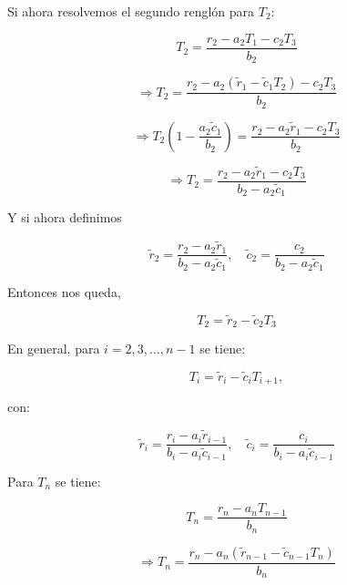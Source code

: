 \documentclass[11pt,a4paper]{article}
\begin{document}
Si ahora resolvemos el segundo rengl\'on para $T_2$:

\begin{equation}
T_2 = \frac{r_2 - a_2 T_1 - c_2 T_3}{b_2}
\end{equation}

\begin{equation}
\Rightarrow T_2 = \frac{r_2 - a_2 (\tilde{r}_1 - \tilde{c}_1 T_2) - c_2 T_3}{b_2}
\end{equation}

\begin{equation}
\Rightarrow T_2 \left(1 - \frac{a_2 \tilde{c}_1}{b_2}\right) = \frac{r_2 - a_2 \tilde{r}_1 - c_2 T_3}{b_2}
\end{equation}

\begin{equation}
\Rightarrow T_2 = \frac{r_2 - a_2 \tilde{r}_1 - c_2 T_3}{b_2 - a_2 \tilde{c}_1}
\end{equation}

Y si ahora definimos 

\begin{equation}
\tilde{r}_2 = \frac{r_2 - a_2 \tilde{r}_1}{b_2 - a_2 \tilde{c}_1}, \quad 
\tilde{c}_2 = \frac{c_2}{b_2 - a_2 \tilde{c}_1}
\label{eq:tri_factor_init2}
\end{equation}

Entonces nos queda,

\begin{equation}
T_2 = \tilde{r}_2 - \tilde{c}_2 T_3
\end{equation}

En general, para $i=2,3,\ldots,n-1$ se tiene:

\begin{equation}
T_i = \tilde{r}_i - \tilde{c}_i T_{i+1},
\end{equation}

con:

\begin{equation}
\tilde{r}_i = \frac{r_i - a_i \tilde{r}_{i-1}}{b_i - a_i \tilde{c}_{i-1}}, \quad
\tilde{c}_i = \frac{c_i}{b_i - a_i \tilde{c}_{i-1}}
\label{eq:tri_solve_general}
\end{equation}

Para $T_n$ se tiene:

\begin{equation}
T_n = \frac{r_n - a_n T_{n-1}}{b_n}
\label{eq:tri_solve_last}
\end{equation}

\begin{equation}
\Rightarrow T_n = \frac{r_n - a_n 
\left( \tilde{r}_{n-1} - \tilde{c}_{n-1} T_{n} \right)}{b_n}
\end{equation}
\end{document}
